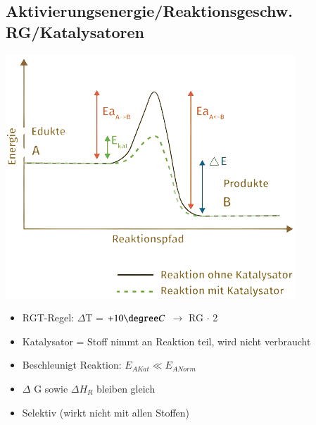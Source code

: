 \subsection{Aktivierungsenergie/Reaktionsgeschw. RG/Katalysatoren}
\begin{minipage}{0.32\linewidth}
    \includegraphics[width=\linewidth]{pictures/Katalysator_1.png}
\end{minipage}
\hfill
\begin{minipage}{0.65\linewidth}
    \begin{itemize}
        \item RGT-Regel: $\Delta$T = $+10\degree C$ $\rightarrow$ RG $\cdot$ 2
        \item Katalysator = Stoff nimmt an Reaktion teil, wird nicht verbraucht 
        \item Beschleunigt Reaktion: $E_{AKat} \ll E_{ANorm}$
        \item $\Delta$ G sowie $\Delta H_R$ bleiben gleich
        \item Selektiv (wirkt nicht mit allen Stoffen)
    \end{itemize}
\end{minipage}
